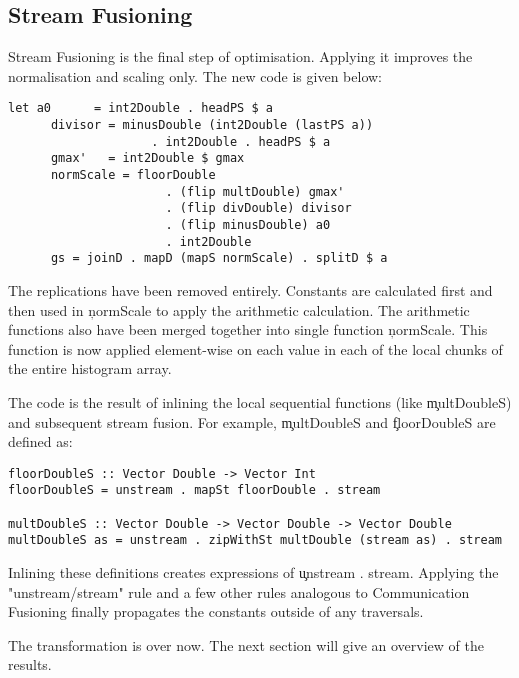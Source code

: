   \subsection{Stream Fusioning}
    Stream Fusioning is the final step of optimisation. Applying it improves
    the normalisation and scaling only. The new code is given below:
    \begin{lstlisting}
let a0      = int2Double . headPS $ a 
      divisor = minusDouble (int2Double (lastPS a))
                    . int2Double . headPS $ a
      gmax'   = int2Double $ gmax
      normScale = floorDouble
                      . (flip multDouble) gmax'
                      . (flip divDouble) divisor
                      . (flip minusDouble) a0
                      . int2Double
      gs = joinD . mapD (mapS normScale) . splitD $ a
     \end{lstlisting}
     The replications have been removed entirely.
     Constants are calculated first and then used in \c{normScale}
     to apply the arithmetic calculation.
     The arithmetic functions also have been merged together into
     single function \c{normScale}. This function is now applied element-wise
     on each value in each of the local chunks of the entire histogram array.
     
     The code is the result of inlining the local sequential functions (like \c{multDoubleS})
     and subsequent stream fusion.
     For example, \c{multDoubleS} and \c{floorDoubleS} are defined as:
     \begin{lstlisting}
floorDoubleS :: Vector Double -> Vector Int
floorDoubleS = unstream . mapSt floorDouble . stream

multDoubleS :: Vector Double -> Vector Double -> Vector Double
multDoubleS as = unstream . zipWithSt multDouble (stream as) . stream
     \end{lstlisting}
     Inlining these definitions creates expressions of \c{unstream . stream}. Applying
     the "unstream/stream" rule and a few other rules analogous to
     Communication Fusioning finally propagates the constants outside
     of any traversals.
     
     The transformation is over now. The next section will give an overview of the results.
         
